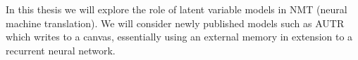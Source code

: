 In this thesis we will explore the role of latent variable models in NMT (neural
machine translation). We will consider newly published models such as AUTR which
writes to a canvas, essentially using an external memory in extension to a
recurrent neural network.